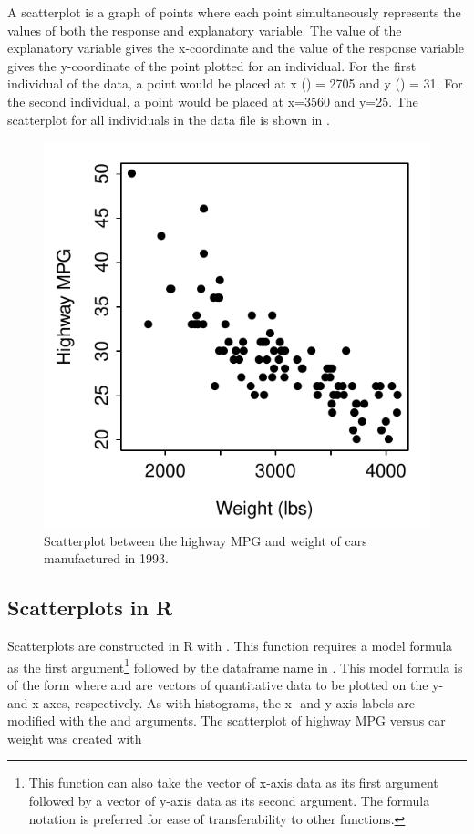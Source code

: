 \documentclass[10pt,openany]{book}\usepackage[]{graphicx}\usepackage[]{color}
\newenvironment{knitrout}{}{} %
\begin{document}
A scatterplot is a graph of points where each point simultaneously represents the values of both the response and explanatory variable.  The value of the explanatory variable gives the x-coordinate and the value of the response variable gives the y-coordinate of the point plotted for an individual.  For the first individual of the  data, a point would be placed at x () = 2705 and y () = 31.  For the second individual, a point would be placed at x=3560 and y=25.  The scatterplot for all individuals in the data file is shown in .
\begin{knitrout}
\color{fgcolor}\begin{figure}[hbtp]

{\centering \includegraphics[width=.4\linewidth]{Figs/carscat1-1} 

}

\caption[Scatterplot between the highway MPG and weight of cars manufactured in 1993]{Scatterplot between the highway MPG and weight of cars manufactured in 1993.}\label{fig:carscat1}
\end{figure}


\end{knitrout}


\subsection{Scatterplots in R}
Scatterplots are constructed in R with .  This function requires a model formula as the first argument\footnote{This function can also take the vector of x-axis data as its first argument followed by a vector of y-axis data as its second argument.  The formula notation is preferred for ease of transferability to other functions.} followed by the dataframe name in .  This model formula is of the form  where  and  are vectors of quantitative data to be plotted on the y- and x-axes, respectively.  As with histograms, the x- and y-axis labels are modified with the  and  arguments.  The scatterplot of highway MPG versus car weight  was created with
\end{document}
